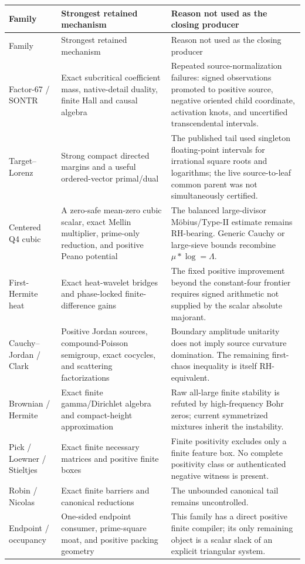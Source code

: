 \documentclass[11pt]{article}
\newcommand{\Lam}{\Lambda}
\begin{document}
\begin{longtable}{p{}p{}p{}}
\toprule
Family & Strongest retained mechanism & Reason not used as the closing producer\\
\midrule
\endfirsthead
\toprule
Family & Strongest retained mechanism & Reason not used as the closing producer\\
\midrule
\endhead
Factor-67 / SONTR & Exact subcritical coefficient mass, native-detail duality, finite Hall and causal algebra & Repeated source-normalization failures: signed observations promoted to positive source, negative oriented child coordinate, activation knots, and uncertified transcendental intervals.\\
Target--Lorenz & Strong compact directed margins and a useful ordered-vector primal/dual & The published tail used singleton floating-point intervals for irrational square roots and logarithms; the live source-to-leaf common parent was not simultaneously certified.\\
Centered Q4 cubic & A zero-safe mean-zero cubic scalar, exact Mellin multiplier, prime-only reduction, and positive Peano potential & The balanced large-divisor M\"obius/Type-II estimate remains RH-bearing. Generic Cauchy or large-sieve bounds recombine $\mu*\log=\Lam$.\\
First-Hermite heat & Exact heat-wavelet bridges and phase-locked finite-difference gains & The fixed positive improvement beyond the constant-four frontier requires signed arithmetic not supplied by the scalar absolute majorant.\\
Cauchy--Jordan / Clark & Positive Jordan sources, compound-Poisson semigroup, exact cocycles, and scattering factorizations & Boundary amplitude unitarity does not imply source curvature domination. The remaining first-chaos inequality is itself RH-equivalent.\\
Brownian / Hermite & Exact finite gamma/Dirichlet algebra and compact-height approximation & Raw all-large finite stability is refuted by high-frequency Bohr zeros; current symmetrized mixtures inherit the instability.\\
Pick / Loewner / Stieltjes & Exact finite necessary matrices and positive finite boxes & Finite positivity excludes only a finite feature box. No complete positivity class or authenticated negative witness is present.\\
Robin / Nicolas & Exact finite barriers and canonical reductions & The unbounded canonical tail remains uncontrolled.\\
Endpoint / occupancy & One-sided endpoint consumer, prime-square moat, and positive packing geometry & This family has a direct positive finite compiler; its only remaining object is a scalar slack of an explicit triangular system.\\
\bottomrule
\end{longtable}
\end{document}
